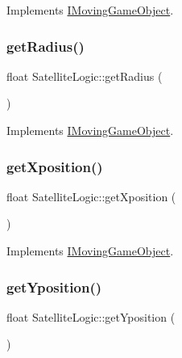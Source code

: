 Implements \hyperlink{class_i_moving_game_object_a075f69d69fd38dc02a0ec3c7b1cb0534}{I\+Moving\+Game\+Object}.

\mbox{\label{class_satellite_logic_a5b86efe041f1d537ec83b9f7dd574b7e}} 
\subsubsection{\texorpdfstring{get\+Radius()}{getRadius()}}
{\footnotesize\ttfamily float Satellite\+Logic\+::get\+Radius (\begin{DoxyParamCaption}{ }\end{DoxyParamCaption})\hspace{0.3cm}{\ttfamily [virtual]}}



Implements \hyperlink{class_i_moving_game_object_ab2120f126d088beda46654aa3ccfd705}{I\+Moving\+Game\+Object}.

\mbox{\label{class_satellite_logic_a3a35c4c5b5ff051dbfcffc7ce85e40a2}} 
\subsubsection{\texorpdfstring{get\+Xposition()}{getXposition()}}
{\footnotesize\ttfamily float Satellite\+Logic\+::get\+Xposition (\begin{DoxyParamCaption}{ }\end{DoxyParamCaption})\hspace{0.3cm}{\ttfamily [virtual]}}



Implements \hyperlink{class_i_moving_game_object_acc7f0195491b1843558c8c558cbc7363}{I\+Moving\+Game\+Object}.

\mbox{\label{class_satellite_logic_a1b0cb67d5bdb3cb120ec12b2be65755c}} 
\subsubsection{\texorpdfstring{get\+Yposition()}{getYposition()}}
{\footnotesize\ttfamily float Satellite\+Logic\+::get\+Yposition (\begin{DoxyParamCaption}{ }\end{DoxyParamCaption})\hspace{0.3cm}{\ttfamily [virtual]}}



